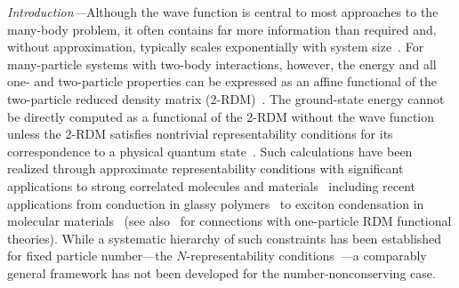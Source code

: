 \documentclass[aps,prl,floatfix,twocolumn,showpacs,10pt]{revtex4-2}
\begin{document}
{\em Introduction---}Although the wave function is central to most approaches to the many-body problem, it often contains far more information than required and, without approximation, typically scales exponentially with system size~\cite{Mazziotti2007, Coleman2000}. For many-particle systems with two-body interactions, however, the energy and all one- and two-particle properties can be expressed as an affine functional of the two-particle reduced density matrix (2-RDM)~\cite{Coleman1963}. The ground-state energy cannot be directly computed as a functional of the 2-RDM without the wave function unless the 2-RDM satisfies nontrivial representability conditions for its correspondence to a physical quantum state~\cite{Coleman1963, Garrod1964, Kummer1967, Erdahl1978, Erdahl1989, Coleman2000, Mazziotti2007, Mazziotti2012b, Mazziotti.2023}. Such calculations have been realized through approximate representability conditions with significant applications to strong correlated molecules and materials~\cite{Erdahl2000, Nakata2001, Mazziotti2001c, Mazziotti2002b, Zhao2004, Mazziotti2004a, Mazziotti2005, Cances2006, Mazziotti2006b, Erdahl2007, Braams2007, Gidofalvi2008, Shenvi2010, Mazziotti2011, Verstichel2012, Baumgratz2012, Poelmans2015, Mazziotti2016, Alcoba2018, Rubio-Garcia2019, Head-Marsden2020, Haim2020, Han2020, Mazziotti2020, Li2021, Knight2022, Kull.2024, Gao.2025dgs, Knight.2025, Schouten.2025} including recent applications from conduction in glassy polymers~\cite{Xie2022} to exciton condensation in molecular materials~\cite{Safaei2018, Schouten.2023, Schouten.2024, Torres.2024} (see also~\cite{Schilling2021, Benavides-Riveros2020, Schilling2019, Piris2021, Piris2017a, Gibney2022a, Liebert.2025axw} for connections with one-particle RDM functional theories). While a systematic hierarchy of such constraints has been established for fixed particle number---the $N$-representability conditions~\cite{Mazziotti2012b, Mazziotti.2023}---a comparably general framework has not been developed for the number-nonconserving case.
\end{document}

